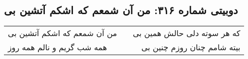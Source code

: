 \begin{center}
\section*{دوبیتی شماره ۳۱۶: من آن شمعم که اشکم آتشین بی}
\label{sec:316}
\begin{longtable}{l p{0.5cm} r}
من آن شمعم که اشکم آتشین بی
&&
که هر سوته دلی حالش همین بی
\\
همه شب گریم و نالم همه روز
&&
بیته شامم چنان روزم چنین بی
\\
\end{longtable}
\end{center}
